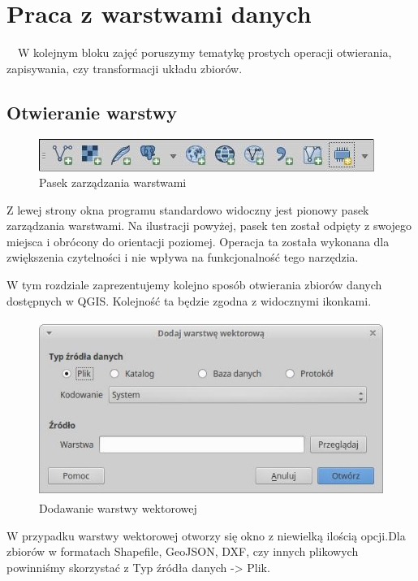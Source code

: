 \documentclass[12pt,a4paper]{book}
\begin{document}
\section{Praca z warstwami danych}
\ \ W kolejnym bloku zajęć poruszymy tematykę prostych operacji otwierania, zapisywania, czy transformacji układu zbiorów.

\subsection{Otwieranie warstwy}

\begin{center}
\begin{figure}
\includegraphics[width=10.929cm,height=1.058cm]{002-pasek-warstwy.jpg}
\caption{Pasek zarządzania warstwami}
\end{figure}
\end{center}
Z lewej strony okna programu standardowo widoczny jest pionowy pasek zarządzania warstwami. Na ilustracji powyżej, pasek ten został odpięty z swojego miejsca i obrócony do orientacji poziomej. Operacja ta została wykonana dla zwiększenia czytelności i nie wpływa na funkcjonalność tego narzędzia.

W tym rozdziale zaprezentujemy kolejno sposób otwierania zbiorów danych dostępnych w QGIS. Kolejność ta będzie zgodna z widocznymi ikonkami.



\begin{center}
\begin{figure}
\includegraphics[width=11.698cm,height=5.75cm]{002-dodaj-wektor.jpg}
\caption{Dodawanie warstwy wektorowej}
\end{figure}
\end{center}
W przypadku warstwy wektorowej otworzy się okno z niewielką ilością opcji.Dla zbiorów w formatach Shapefile, GeoJSON, DXF, czy innych plikowych powinniśmy skorzystać z Typ źródła danych -{\textgreater} Plik.
\end{document}

